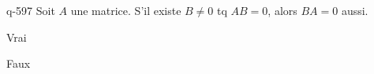 \begin{truefalse}{q-597}
Soit $A$ une matrice. S'il existe $B\neq 0$ tq $AB=0$, alors $BA=0$ aussi.
\item Vrai
\item* Faux
\end{truefalse}

